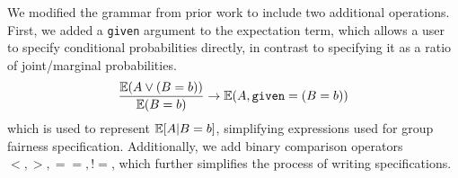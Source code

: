 We modified the grammar from prior work to include two additional operations. 
First, we added a \texttt{given} argument to the expectation term, which allows a user to specify conditional probabilities directly, in contrast to specifying it as a ratio of joint/marginal probabilities. 
 \begin{align*}
     \frac{\mathbb{E}(A \vee (B=b))}{\mathbb{E}(B=b)} \rightarrow \mathbb{E}(A, \mathtt{given}=(B=b))
 \end{align*}
 which is used to represent $\mathbb{E}[A|B=b]$, simplifying expressions used for group fairness specification.
Additionally, we add binary comparison operators $<, >, ==, !=$, which further simplifies the process of writing specifications. %


